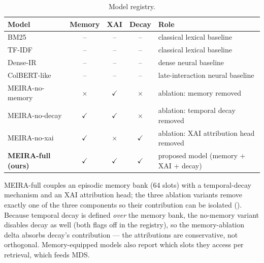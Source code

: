 \begin{table}[tb]
\setlength{\tabcolsep}{3pt}
\footnotesize
\caption{Model registry.}
\label{tab:models}
\centering
\begin{tabular}{lcccp{}}
\toprule
Model & Memory & XAI & Decay & Role \\
\midrule
BM25 & -- & -- & -- & classical lexical baseline \\
TF-IDF & -- & -- & -- & classical lexical baseline \\
Dense-IR & -- & -- & -- & dense neural baseline \\
ColBERT-like & -- & -- & -- & late-interaction neural baseline \\
MEIRA-no-memory & $\times$ & $\checkmark$ & $\times$ & ablation: memory removed \\
MEIRA-no-decay & $\checkmark$ & $\checkmark$ & $\times$ & ablation: temporal decay removed \\
MEIRA-no-xai & $\checkmark$ & $\times$ & $\checkmark$ & ablation: XAI attribution head removed \\
\textbf{MEIRA-full (ours)} & $\checkmark$ & $\checkmark$ & $\checkmark$ & proposed model (memory + XAI + decay) \\
\bottomrule
\end{tabular}
\end{table}

MEIRA-full couples an episodic memory bank (64 slots) with a temporal-decay mechanism and an XAI attribution head; the three ablation variants remove exactly one of the three components so their contribution can be isolated (). Because temporal decay is defined \emph{over} the memory bank, the no-memory variant disables decay as well (both flags off in the registry), so the memory-ablation delta absorbs decay's contribution --- the attributions are conservative, not orthogonal. Memory-equipped models also report which slots they access per retrieval, which feeds MDS.


